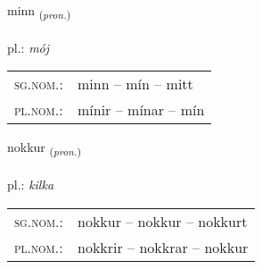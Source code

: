 \documentclass[frontgrid, backgrid]{flacards}\usepackage[]{graphicx}\usepackage[]{xcolor}
\begin{document}
{minn \small{\textsubscript{(\textit{pron.})}} \\[1ex] %
\textphonetic{[mɪn]} \\
pl.: \emph{mój} \\  [2ex]
\renewcommand*{\arraystretch}{0.8}
\begin{tabular}{ll}
\textsc{sg.nom.}: & minn  --  mín -- mitt \\ 
\textsc{pl.nom.}: & mínir -- mínar -- mín
\end{tabular}
}

\renewcommand{\flhead}{\vskip5pt \fboxsep=0pt {\small\bfseries\footnotesize Fornafn | Pronoun}}
\renewcommand{\fcfoot}{\vskip5pt \fboxsep=0pt \hspace{2pt}{\small\bfseries\footnotesize 1K}}

\renewcommand{\blhead}{\vskip5pt {\small\bfseries\footnotesize Fornafn | Pronoun }}
\renewcommand{\bcfoot}{\vskip5pt \hspace{2pt}{\small\bfseries\footnotesize 1K}}


{nokkur \small{\textsubscript{(\textit{pron.})}} \\[1ex] %
\textphonetic{[nɔhkʏr]} \\
pl.: \emph{kilka} \\  [2ex]
\renewcommand*{\arraystretch}{0.8}
\begin{tabular}{ll}
\textsc{sg.nom.}: & nokkur  --  nokkur -- nokkurt \\ 
\textsc{pl.nom.}: & nokkrir -- nokkrar -- nokkur
\end{tabular}
}

\renewcommand{\flhead}{\vskip5pt \fboxsep=0pt {\small\bfseries\footnotesize Sagnorð | Verb}}
\renewcommand{\fcfoot}{\vskip5pt \fboxsep=0pt \hspace{2pt}{\small\bfseries\footnotesize 1K}}

\renewcommand{\blhead}{\vskip5pt {\small\bfseries\footnotesize Sagnorð | Verb }}
\renewcommand{\bcfoot}{\vskip5pt \hspace{2pt}{\small\bfseries\footnotesize 1K}}
\end{document}
